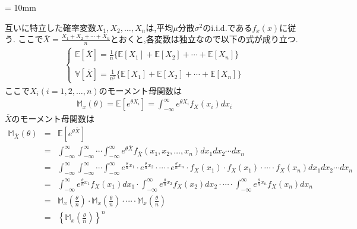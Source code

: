 \documentclass[12pt, platex,dvipdfmx]{jsarticle}
\begin{document}
\baselineskip = 10mm

互いに特立した確率変数$X_1,X_2,\hdots,X_n$は,平均$\mu$分散$\sigma^2$のi.i.d.である$f_x(x)$に従う.
ここで$\overline{X}=\frac{X_1+X_2+\cdots+X_n}{n}$とおくと,各変数は独立なので以下の式が成り立つ.
\begin{eqnarray*}
\left\{
\begin{array}{l}
    \mathbb{E}[\overline{X}]=\frac{1}{n}\{ \mathbb{E}[X_1]+\mathbb{E}[X_2]+\cdots+\mathbb{E}[X_n]\} \\ \\
    \mathbb{V}[\overline{X}]=\frac{1}{n^2}\{ \mathbb{E}[X_1]+\mathbb{E}[X_2]+\cdots+\mathbb{E}[X_n]\}
\end{array} \right.
\end{eqnarray*}
ここで$X_i(i=1,2,\hdots,n)$のモーメント母関数は
\begin{eqnarray*}
    {\mathbb M}_x(\theta)=\mathbb{E}[e^{\theta X_i}]=\int_{-\infty}^{\infty}e^{\theta X_i}f_X(x_i)dx_i
\end{eqnarray*}
$\overline{X}$のモーメント母関数は
\begin{eqnarray*}
    {\mathbb M}_{\overline{X}}(\theta)&=&\mathbb{E}[e^{\theta \overline{X}}] \\
    &=&\int_{-\infty}^{\infty}\int_{-\infty}^{\infty} {\cdots \int_{-\infty}^{\infty} e^{\theta \overline{X}} f_{\overline{X}}(x_1,x_2,\hdots,x_n)dx_1 dx_2\cdots dx_n }\\
    &=&\int_{-\infty}^{\infty}\int_{-\infty}^{\infty} \cdots \int_{-\infty}^{\infty} e^{\frac{\theta}{n} x_1} \cdot e^{\frac{\theta}{n} x_2} \cdot \cdots \cdot e^{\frac{\theta}{n} x_n} \cdot f_X(x_1) \cdot f_X(x_1) \cdot \cdots \cdot f_X(x_n) dx_1dx_2\cdots dx_n \\
    &=&\int_{-\infty}^{\infty} e^{\frac{\theta}{n} x_1}f_X(x_1)dx_1 \cdot \int_{-\infty}^{\infty} e^{\frac{\theta}{n} x_2}f_X(x_2)dx_2 \cdot \cdots \cdot \int_{-\infty}^{\infty} e^{\frac{\theta}{n} x_n}f_X(x_n)dx_n \\
    &=&{\mathbb M}_x\left(\frac{\theta}{n}\right) \cdot {\mathbb M}_x\left(\frac{\theta}{n}\right) \cdot \cdots \cdot {\mathbb M}_x\left(\frac{\theta}{n}\right) \\
    &=&\left\{{\mathbb M}_x\left(\frac{\theta}{n}\right)\right\}^n
\end{eqnarray*}
\end{document}
